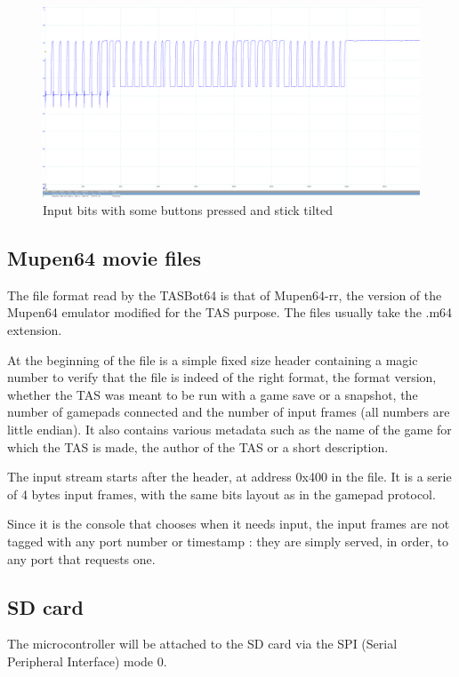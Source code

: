 \documentclass[a4paper,oneside,12pt]{article}
\begin{document}
\begin{figure}
  \includegraphics[width=\textwidth]{some_input.png}
  \caption{Input bits with some buttons pressed and stick tilted}
  \label{some_input}
\end{figure}

\subsection{Mupen64 movie files}
The file format read by the TASBot64 is that of Mupen64-rr, the version of the
Mupen64 emulator modified for the TAS purpose. The files usually take the .m64
extension.

At the beginning of the file is a simple fixed size header containing a magic
number to verify that the file is indeed of the right format, the format
version, whether the TAS was meant to be run with a game save or a snapshot, the
number of gamepads connected and the number of input frames (all numbers are
little endian). It also contains various metadata such as the name of the game
for which the TAS is made, the author of the TAS or a short description.

The input stream starts after the header, at address 0x400 in the file. It is a
serie of 4 bytes input frames, with the same bits layout as in the gamepad
protocol.

Since it is the console that chooses when it needs input, the input frames are
not tagged with any port number or timestamp : they are simply served, in order,
to any port that requests one.

\subsection{SD card}
The microcontroller will be attached to the SD card via the SPI (Serial Peripheral Interface) mode 0.
\end{document}
